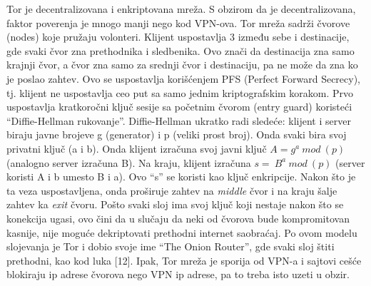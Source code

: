 \documentclass[
]{article}
\begin{document}
Tor je decentralizovana i enkriptovana mreža. S obzirom da je
decentralizovana, faktor poverenja je mnogo manji nego kod VPN-ova. Tor
mreža sadrži čvorove (nodes) koje pružaju volonteri. Klijent uspostavlja
3 između sebe i destinacije, gde svaki čvor zna prethodnika i
sledbenika. Ovo znači da destinacija zna samo krajnji čvor, a čvor zna
samo za srednji čvor i destinaciju, pa ne može da zna ko je poslao
zahtev. Ovo se uspostavlja korišćenjem PFS (Perfect Forward Secrecy),
tj. klijent ne uspostavlja ceo put sa samo jednim kriptografskim
korakom. Prvo uspostavlja kratkoročni ključ sesije sa početnim čvorom
(entry guard) koristeći ``Diffie-Hellman rukovanje''. Diffie-Hellman
ukratko radi sledeće: klijent i server biraju javne brojeve g
(generator) i p (veliki prost broj). Onda svaki bira svoj privatni ključ
(a i b). Onda klijent izračuna svoj javni ključ \(A = g^{a}\ mod\ (p)\)
(analogno server izračuna B). Na kraju, klijent izračuna
\(s = \ B^{a}\ mod\ (p)\) (server koristi A i b umesto B i a). Ovo ``s''
se koristi kao ključ enkripcije. Nakon što je ta veza uspostavljena,
onda proširuje zahtev na \emph{middle} čvor i na kraju šalje zahtev ka
\emph{exit} čvoru. Pošto svaki sloj ima svoj ključ koji nestaje nakon
što se konekcija ugasi, ovo čini da u slučaju da neki od čvorova bude
kompromitovan kasnije, nije moguće dekriptovati prethodni internet
saobraćaj. Po ovom modelu slojevanja je Tor i dobio svoje ime ``The
Onion Router'', gde svaki sloj štiti prethodni, kao kod luka {[}12{]}.
Ipak, Tor mreža je sporija od VPN-a i sajtovi cešće blokiraju ip adrese
čvorova nego VPN ip adrese, pa to treba isto uzeti u obzir.
\end{document}
